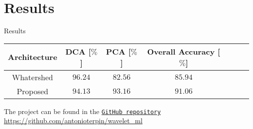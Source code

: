 \section{Results}
    \begin{frame}{Results}
        \begin{center}
            \begin{tabular}{ |c|c|c|c|c|c|c| } 
             \hline
             Architecture & DCA [$\%$] & PCA [$\%$] & Overall Accuracy [$\%$]\\\hline
             Whatershed & $96.24$ & $82.56$ & $85.94$\\ 
             Proposed & $94.13$ & $93.16$ & $91.06$\\
             \hline
            \end{tabular}
            \vskip 1.5cm
            The project can be found in the \href{https://github.com/antonioterpin/wavelet_ml}{\texttt{GitHub repository}}
            \vskip 0.5cm
            \url{https://github.com/antonioterpin/wavelet_ml}
        \end{center}
    \end{frame}